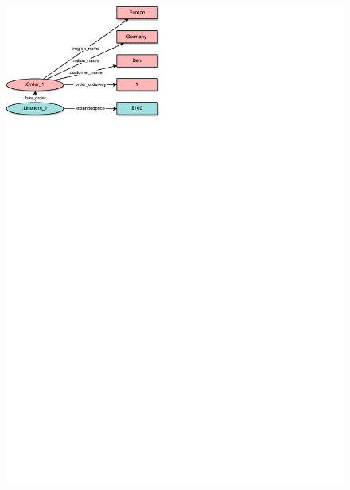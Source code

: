 \begin{frame}{\patsec}
\framesubtitle{\starpat}
    \begin{figure}
        \includegraphics[trim=0 648 325 0,clip,width=1\textheight]{images/starpattern.pdf}
    \end{figure}
\end{frame}

